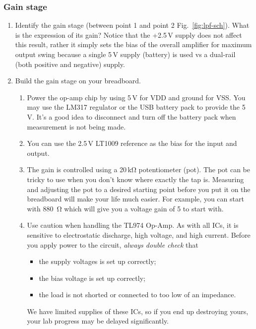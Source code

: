 \documentclass[letterpaper, 11pt]{article}
\begin{document}
\subsubsection{Gain stage}
\begin{enumerate}

	\item Identify the gain stage (between point 1 and point 2 Fig.~\ref{fig:lpf-sch}). What is the expression of its gain? Notice that the +2.5\,V supply does not affect this result, rather it simply sets the bias of the overall amplifier for maximum output swing because a single 5\,V supply (battery) is used vs a dual-rail (both positive and negative) supply.
	
	\item Build the gain stage on your breadboard. 
		\begin{enumerate}
			\item Power the op-amp chip by using 5\,V for VDD and ground for VSS. You may use the LM317 regulator or the USB battery  pack to provide the 5\,V. It's a good idea to disconnect and turn off the battery pack when measurement is not being made.
			
			\item You can use the 2.5\,V LT1009 reference as the bias for the input and output. 
			
			\item The gain is controlled using a 20\,k\si{\ohm} potentiometer (pot). The pot can be tricky to use when you don't know where exactly the tap is. Measuring and adjusting the pot to a desired starting point before you put it on the breadboard will make your life much easier. For example, you can start with \SI{880}{\ohm} which will give you a voltage gain of 5 to start with. 
			
			\item Use caution when handling the TL974 Op-Amp. As with all ICs, it is sensitive to electrostatic discharge, high voltage, and high current. Before you apply power to the circuit, \textit{always double check} that 
				\begin{itemize}
					\item the supply voltages is set up correctly;
					\item the bias voltage is set up correctly;
					\item the load is not shorted or connected to too low of an impedance.
				\end{itemize}
			We have limited supplies of these ICs, so if you end up destroying yours, your lab progress may be delayed significantly. 
		\end{enumerate}


\end{enumerate}
\end{document}
